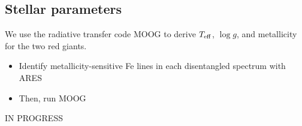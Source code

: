 \subsection{Stellar parameters}\label{parameters}
We use the radiative transfer code MOOG \citep{sne73} to derive $T_{\rm{eff}}$, $\log g$, and metallicity for the two red giants.
\begin{itemize}
\item Identify metallicity-sensitive Fe lines in each disentangled spectrum with ARES
\item Then, run MOOG
\end{itemize}

IN PROGRESS
